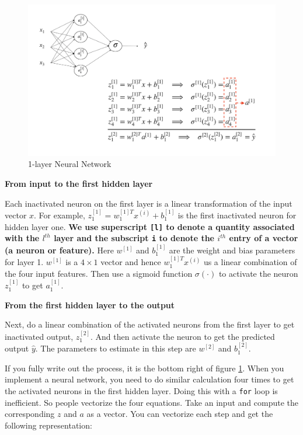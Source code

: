 \documentclass[
  12pt,
]{krantz}
\begin{document}
\begin{figure}

{\centering \includegraphics[width=0.8\linewidth]{images/onelayerNN} 

}

\caption{1-layer Neural Network}\label{fig:onelayernn}
\end{figure}

\textbf{From input to the first hidden layer}

Each inactivated neuron on the first layer is a linear transformation of the input vector \(x\). For example, \(z^{[1]}_1 = w^{[1]T}_1x^{(i)} + b_1^{[1]}\) is the first inactivated neuron for hidden layer one. \textbf{We use superscript \texttt{{[}l{]}} to denote a quantity associated with the \(l^{th}\) layer and the subscript \texttt{i} to denote the \(i^{th}\) entry of a vector (a neuron or feature).} Here \(w^{[1]}\) and \(b_1^{[1]}\) are the weight and bias parameters for layer 1. \(w^{[1]}\) is a \(4 \times 1\) vector and hence \(w^{[1]T}_1x^{(i)}\) us a linear combination of the four input features. Then use a sigmoid function \(\sigma(\cdot)\) to activate the neuron \(z^{[1]}_1\) to get \(a^{[1]}_1\).

\textbf{From the first hidden layer to the output}

Next, do a linear combination of the activated neurons from the first layer to get inactivated output, \(z^{[2]}_1\). And then activate the neuron to get the predicted output \(\hat{y}\). The parameters to estimate in this step are \(w^{[2]}\) and \(b_1^{[2]}\).

If you fully write out the process, it is the bottom right of figure \ref{fig:onelayernn}. When you implement a neural network, you need to do similar calculation four times to get the activated neurons in the first hidden layer. Doing this with a \texttt{for} loop is inefficient. So people vectorize the four equations. Take an input and compute the corresponding \(z\) and \(a\) as a vector. You can vectorize each step and get the following representation:
\end{document}
